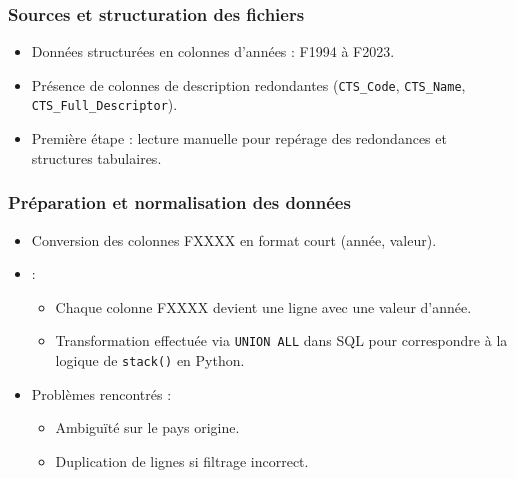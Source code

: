 \documentclass[11pt]{beamer}
\begin{document}
\begin{frame}
  \frametitle{Sources et structuration des fichiers}
  \begin{itemize}
    \item<1-> Données structurées en colonnes d'années : F1994 à F2023.
    \item<2-> Présence de colonnes de description redondantes (\texttt{CTS\_Code}, \texttt{CTS\_Name}, \texttt{CTS\_Full\_Descriptor}).
    \item<3-> Première étape : lecture manuelle pour repérage des redondances et structures tabulaires.
  \end{itemize}
\end{frame}

\begin{frame}
  \frametitle{Préparation et normalisation des données}
  \begin{itemize}
    \item<1-> Conversion des colonnes FXXXX en format court (année, valeur).
    \item<2->  :
    \begin{itemize}
      \item Chaque colonne FXXXX devient une ligne avec une valeur d'année.
      \item Transformation effectuée via \texttt{UNION ALL} dans SQL pour correspondre à la logique de \texttt{stack()} en Python.
    \end{itemize}
    \item<3-> Problèmes rencontrés :
    \begin{itemize}
      \item Ambiguïté sur le pays origine.
      \item Duplication de lignes si filtrage incorrect.
    \end{itemize}
  \end{itemize}
\end{frame}
\end{document}
